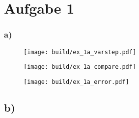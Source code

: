 \section*{Aufgabe 1}
\subsubsection{a)}
\begin{figure}
    \centering
    \texttt{[image: build/ex\_1a\_varstep.pdf]}
\end{figure}

\begin{figure}
    \centering
    \texttt{[image: build/ex\_1a\_compare.pdf]}
\end{figure}

\begin{figure}
    \centering
    \texttt{[image: build/ex\_1a\_error.pdf]}
\end{figure}
\FloatBarrier
\subsection{b)}